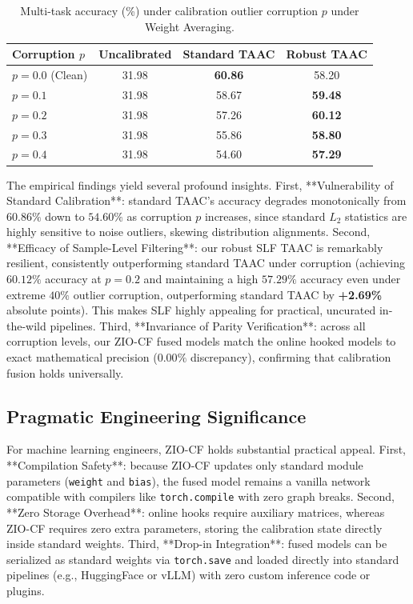 \documentclass{article}
\begin{document}
\begin{table}[ht]
\caption{Multi-task accuracy (\%) under calibration outlier corruption $p$ under Weight Averaging.}
\label{tab:robust_results}
\vskip 0.1in
\begin{center}
\begin{scriptsize}
\begin{sc}
\setlength{\tabcolsep}{2.5pt}
\begin{tabular}{lccc}
\toprule
Corruption $p$ & Uncalibrated & Standard TAAC & Robust TAAC \\
\midrule
$p = 0.0$ (Clean) & 31.98 & \textbf{60.86} & 58.20 \\
$p = 0.1$ & 31.98 & 58.67 & \textbf{59.48} \\
$p = 0.2$ & 31.98 & 57.26 & \textbf{60.12} \\
$p = 0.3$ & 31.98 & 55.86 & \textbf{58.80} \\
$p = 0.4$ & 31.98 & 54.60 & \textbf{57.29} \\
\bottomrule
\end{tabular}
\end{sc}
\end{scriptsize}
\end{center}
\vskip -0.1in
\end{table}

The empirical findings yield several profound insights. First, **Vulnerability of Standard Calibration**: standard TAAC's accuracy degrades monotonically from $60.86\%$ down to $54.60\%$ as corruption $p$ increases, since standard $L_2$ statistics are highly sensitive to noise outliers, skewing distribution alignments. Second, **Efficacy of Sample-Level Filtering**: our robust SLF TAAC is remarkably resilient, consistently outperforming standard TAAC under corruption (achieving $60.12\%$ accuracy at $p=0.2$ and maintaining a high $57.29\%$ accuracy even under extreme $40\%$ outlier corruption, outperforming standard TAAC by \textbf{+2.69\%} absolute points). This makes SLF highly appealing for practical, uncurated in-the-wild pipelines. Third, **Invariance of Parity Verification**: across all corruption levels, our ZIO-CF fused models match the online hooked models to exact mathematical precision ($0.00\%$ discrepancy), confirming that calibration fusion holds universally.

\subsection{Pragmatic Engineering Significance}
For machine learning engineers, ZIO-CF holds substantial practical appeal. First, **Compilation Safety**: because ZIO-CF updates only standard module parameters (\texttt{weight} and \texttt{bias}), the fused model remains a vanilla network compatible with compilers like \texttt{torch.compile} with zero graph breaks. Second, **Zero Storage Overhead**: online hooks require auxiliary matrices, whereas ZIO-CF requires zero extra parameters, storing the calibration state directly inside standard weights. Third, **Drop-in Integration**: fused models can be serialized as standard weights via \texttt{torch.save} and loaded directly into standard pipelines (e.g., HuggingFace or vLLM) with zero custom inference code or plugins.
\end{document}

